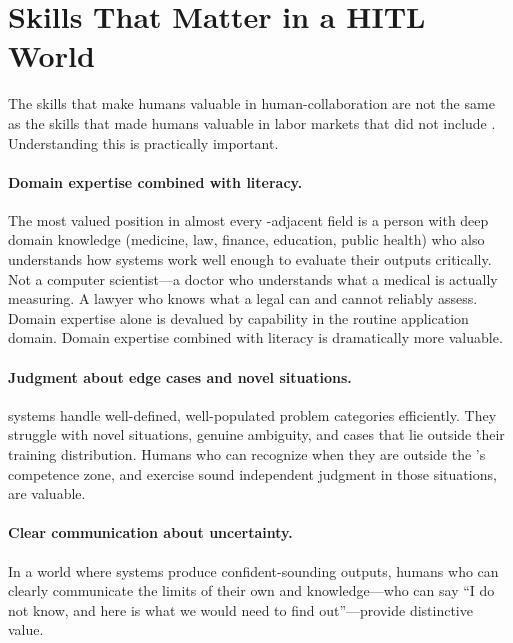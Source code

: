 \section{Skills That Matter in a HITL World}
\label{sec:ch19-skills}

The skills that make humans valuable in human-\ai collaboration are not the same as the skills that made humans valuable in labor markets that did not include \ai. Understanding this is practically important.

\paragraph{Domain expertise combined with \ai literacy.} The most valued position in almost every \ai-adjacent field is a person with deep domain knowledge (medicine, law, finance, education, public health) who also understands how \ai systems work well enough to evaluate their outputs critically. Not a computer scientist---a doctor who understands what a medical \ai is actually measuring. A lawyer who knows what a legal \ai can and cannot reliably assess. Domain expertise alone is devalued by \ai capability in the routine application domain. Domain expertise combined with \ai literacy is dramatically more valuable.

\paragraph{Judgment about edge cases and novel situations.} \ai systems handle well-defined, well-populated problem categories efficiently. They struggle with novel situations, genuine ambiguity, and cases that lie outside their training distribution. Humans who can recognize when they are outside the \ai's competence zone, and exercise sound independent judgment in those situations, are valuable.

\paragraph{Clear communication about uncertainty.} In a world where \ai systems produce confident-sounding outputs, humans who can clearly communicate the limits of their own and \ai knowledge---who can say ``I do not know, and here is what we would need to find out''---provide distinctive value.


